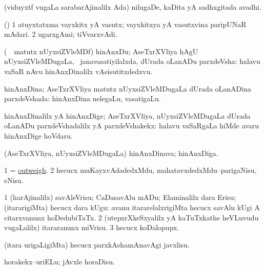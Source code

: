 \bentry
{}
\gl{\nA}
\bmng
(viduyxtf \mo vugaLa sarabarAjinalilx Ada) nilugaDe, kaDita yA sadhxgitada avadhi. 
\emng
\eentry

\bentry
{}
\gl{\nA}
\bmng
(\ashi) 
\bnum
\num{1} atuyxtatxma vayxkitx yA vasutx; vayxkitxya yA vasutxvina paripUNaR mAdari. 
\num{2} ugarxgAmi; tiVvarxvAdi. 
\enum
\emng
\eentry

\bentry
{}
\gl{\nA}
\bmng
(\kanmu\ \AseTxrXV\ matutx nUyxsiZVleMDf) hinAnxDu; AseTxrXVliya hAgU nUyxsiZVleMDugaLa, \sA\ janavasatiyilalxda, dUrada oLanADu parxdeVsha:  halavu vaSaR nAvu hinAnxDinalilx vAsisutitxdedxvu. 
\emng
\eentry

\bentry
{}
\gl{\gu}
\bmng
hinAnxDina; AseTxrXVliya matutx nUyxsiZVleMDugaLa dUrada oLanADina parxdeVshada:  hinAnxDina nelegaLu, vasatigaLu. 
\emng
\eentry

\bentry
{}
\gl{\kirxvi}
\bmng
hinAnxDinalilx yA hinAnxDige; AseTxrXVliya, nUyxsiZVleMDugaLa dUrada oLanADu parxdeVshadalilx yA parxdeVshakekx:  halavu vaSaRgaLa hiMde avaru hinAnxDige hoVdaru. 
\emng
\eentry

\bentry
{}
\gl{\nA}
\bmng
(AseTxrXVliya, nUyxsiZVleMDugaLa) hinAnxDinava; hinAnxDiga. 
\emng
\eentry

\bentry
{}
\gl{\sakirx}
\bmng
\bnum
\num{1} = \hyperlink{outweigh}{outweigh}. 
\num{2} hecucx muKayxvAdadedxMdu, mahatavxdedxMdu--parigaNisu, eNisu. 
\enum
\emng
\eentry

\bentry
{}
\gl{\sakirx}
\bmng
\bnum
\num{1} (harAjinalilx) savAleVrisu; CaDasavAlu mADu; Elaminalilx dara Erisu; (itararigiMta) hecucx dara kUgu:  avanu itararelalxrigiMta hecucx savAlu kUgi A citarxvanunx hoDedubiTaTx. 
\num{2} (utepxrXkeSxyalilx yA kaTuTxkathe heVLuvudu \mo vugaLalilx) itararanunx miVrisu. 
\num{3} hecucx koDalopupx. 
\enum
\emng
\eentry

\bentry
{}
\gl{\sakirx}
\bmng
(itara urigaLigiMta) hecucx parxkAshamAnavAgi javxlisu. 
\emng

\noindent
\gl{\akirx}
\bmng
horakekx--uriELu; jAvxle horaDisu. 
\emng
\eentry

